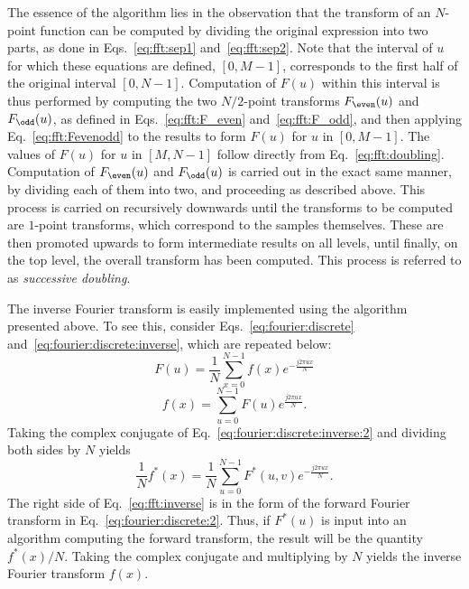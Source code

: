 The essence of the {\fft} algorithm lies in the observation that the
transform of an $N$-point function can be computed by dividing the
original expression into two parts, as done in Eqs.~\ref{eq:fft:sep1}
and~\ref{eq:fft:sep2}.  Note that the interval of $u$ for which these
equations are defined, $[0,M-1]$, corresponds to the first half of the
original interval $[0,N-1]$.  Computation of $F(u)$ within this
interval is thus performed by computing the two $N/2$-point transforms
$F_{\even}(u)$ and $F_{\odd}(u)$, as defined in
Eqs.~\ref{eq:fft:F_even} and~\ref{eq:fft:F_odd}, and then applying
Eq.~\ref{eq:fft:Fevenodd} to the results to form $F(u)$ for $u$ in
$[0,M-1]$.  The values of $F(u)$ for $u$ in $[M,N-1]$ follow directly
from Eq.~\ref{eq:fft:doubling}.  Computation of $F_{\even}(u)$ and
$F_{\odd}(u)$ is carried out in the exact same manner, by dividing
each of them into two, and proceeding as described above.  This
process is carried on recursively downwards until the transforms to be
computed are $1$-point transforms, which correspond to the samples
themselves.  These are then promoted upwards to form intermediate
results on all levels, until finally, on the top level, the overall
transform has been computed.  This process is referred to as {\em
  successive doubling\/}.

The inverse Fourier transform is easily implemented using the {\fft}
algorithm presented above.  To see this, consider
Eqs.~\ref{eq:fourier:discrete} and~\ref{eq:fourier:discrete:inverse},
which are repeated below:
\begin{equation}
\label{eq:fourier:discrete:2}
  F(u)=\frac{1}{N}\sum_{x=0}^{N-1}f(x)e^{-\frac{j2\pi ux}{N}}
\end{equation}
\begin{equation}
\label{eq:fourier:discrete:inverse:2}
  f(x)=\sum_{u=0}^{N-1}F(u)e^{\frac{j2\pi ux}{N}}\mbox{.}
\end{equation}
Taking the complex conjugate of
Eq.~\ref{eq:fourier:discrete:inverse:2} and dividing both sides by $N$
yields 
\begin{equation}
\label{eq:fft:inverse}
  \frac{1}{N}f^{\ast}(x)=\frac{1}{N}\sum_{u=0}^{N-1}F^{\ast}(u,v)
  e^{-\frac{j2\pi ux}{N}}\mbox{.}
\end{equation}
The right side of Eq.~\ref{eq:fft:inverse} is in the form of the
forward Fourier transform in Eq.~\ref{eq:fourier:discrete:2}.  Thus,
if $F^{\ast}(u)$ is input into an algorithm computing the forward
transform, the result will be the quantity $f^{\ast}(x)/N$.  Taking
the complex conjugate and multiplying by $N$ yields the inverse
Fourier transform $f(x)$.

